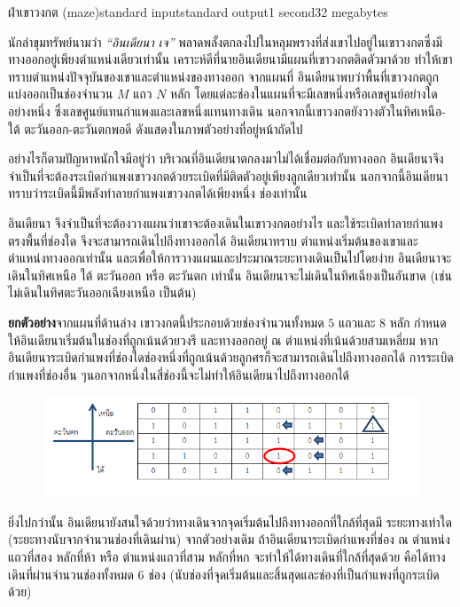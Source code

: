 \documentclass[11pt,a4paper]{article}
\begin{document}
\begin{problem}{ฝ่าเขาวงกต (maze)}{standard input}{standard output}{1 second}{32 megabytes}


นักล่าขุมทรัพย์นามว่า \textit{“อินเดียนา เจ”} พลาดพลั้งตกลงไปในหลุมพรางที่ส่งเขาไปอยู่ในเขาวงกตซึ่งมีทางออกอยู่เพียงตำแหน่งเดียวเท่านั้น  เคราะห์ดีที่นายอินเดียนามีแผนที่เขาวงกตติดตัวมาด้วย ทำให้เขาทราบตำแหน่งปัจจุบันของเขาและตำแหน่งของทางออก  จากแผนที่ อินเดียนาพบว่าพื้นที่เขาวงกตถูกแบ่งออกเป็นช่องจำนวน $M$ แถว $N$ หลัก โดยแต่ละช่องในแผนที่จะมีเลขหนึ่งหรือเลขศูนย์อย่างใดอย่างหนึ่ง ซึ่งเลขศูนย์แทนกำแพงและเลขหนึ่งแทนทางเดิน นอกจากนี้เขาวงกตยังวางตัวในทิศเหนือ-ใต้ ตะวันออก-ตะวันตกพอดี
ดังแสดงในภาพตัวอย่างที่อยู่หน้าถัดไป

อย่างไรก็ตามปัญหาหนักใจมีอยู่ว่า บริเวณที่อินเดียนาตกลงมาไม่ได้เชื่อมต่อกับทางออก อินเดียนาจึงจำเป็นที่จะต้องระเบิดกำแพงเขาวงกตด้วยระเบิดที่มีติดตัวอยู่เพียงลูกเดียวเท่านั้น นอกจากนี้อินเดียนาทราบว่าระเบิดนี้มีพลังทำลายกำแพงเขาวงกตได้เพียงหนึ่ง ช่องเท่านั้น

          อินเดียนา จึงจำเป็นที่จะต้องวางแผนว่าเขาจะต้องเดินในเขาวงกตอย่างไร และใช้ระเบิดทำลายกำแพงตรงพื้นที่ช่องใด จึงจะสามารถเดินไปถึงทางออกได้  อินเดียนาทราบ ตำแหน่งเริ่มต้นของเขาและตำแหน่งทางออกเท่านั้น และเพื่อให้การวางแผนและประมาณระยะทางเดินเป็นไปโดยง่าย อินเดียนาจะเดินในทิศเหนือ ใต้ ตะวันออก หรือ ตะวันตก เท่านั้น อินเดียนาจะไม่เดินในทิศเฉียงเป็นอันขาด (เช่น ไม่เดินในทิศตะวันออกเฉียงเหนือ เป็นต้น)

\textbf{ยกตัวอย่าง}จากแผนที่ด้านล่าง เขาวงกตนี้ประกอบด้วยช่องจำนวนทั้งหมด $5$ แถวและ $8$ หลัก กำหนดให้อินเดียนาเริ่มต้นในช่องที่ถูกเน้นด้วยวงรี และทางออกอยู่ ณ ตำแหน่งที่เน้นด้วยสามเหลี่ยม หากอินเดียนาระเบิดกำแพงที่ช่องใดช่องหนึ่งที่ถูกเน้นด้วยลูกศรก็จะสามารถเดินไปถึงทางออกได้  การระเบิดกำแพงที่ช่องอื่น ๆนอกจากหนึ่งในสี่ช่องนี้จะไม่ทำให้อินเดียนาไปถึงทางออกได้

\begin{figure}[!h]
\centering
\includegraphics[width=1\textwidth]{../latex/img/1160/1160-1.png}
\end{figure}

ยิ่งไปกว่านั้น อินเดียนายังสนใจด้วยว่าทางเดินจากจุดเริ่มต้นไปถึงทางออกที่ใกล้ที่สุดมี ระยะทางเท่าใด (ระยะทางนับจากจำนวนช่องที่เดินผ่าน) จากตัวอย่างเดิม ถ้าอินเดียนาระเบิดกำแพงที่ช่อง ณ ตำแหน่งแถวที่สอง หลักที่ห้า หรือ ตำแหน่งแถวที่สาม หลักที่หก จะทำให้ได้ทางเดินที่ใกล้ที่สุดด้วย คือได้ทางเดินที่ผ่านจำนวนช่องทั้งหมด $6$ ช่อง (นับช่องที่จุดเริ่มต้นและสิ้นสุดและช่องที่เป็นกำแพงที่ถูกระเบิดด้วย)




\end{problem}
\end{document}
